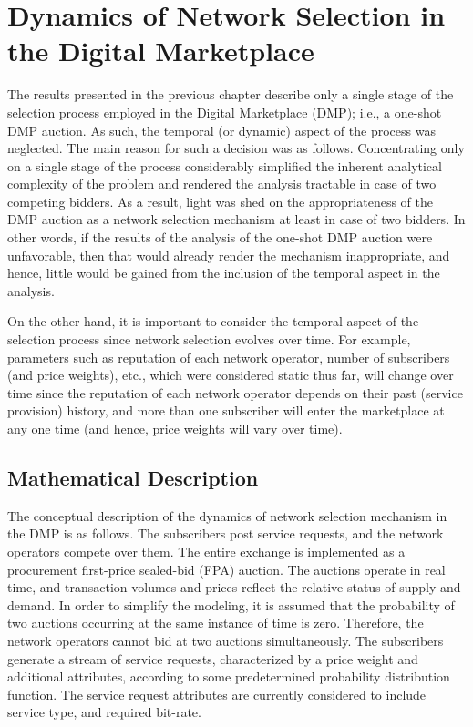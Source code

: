 \chapter{Dynamics of Network Selection in the Digital Marketplace} %
\label{cha:dynamics_of_network_selection_in_the_digital_marketplace}

\minitoc
\vspace{10mm}

The results presented in the previous chapter describe only a single stage of the selection process employed in the Digital Marketplace (DMP); i.e., a one-shot DMP auction. As such, the temporal (or dynamic) aspect of the process was neglected. The main reason for such a decision was as follows. Concentrating only on a single stage of the process considerably simplified the inherent analytical complexity of the problem and rendered the analysis tractable in case of two competing bidders. As a result, light was shed on the appropriateness of the DMP auction as a network selection mechanism at least in case of two bidders. In other words, if the results of the analysis of the one-shot DMP auction were unfavorable, then that would already render the mechanism inappropriate, and hence, little would be gained from the inclusion of the temporal aspect in the analysis.

On the other hand, it is important to consider the temporal aspect of the selection process since network selection evolves over time. For example, parameters such as reputation of each network operator, number of subscribers (and price weights), etc., which were considered static thus far, will change over time since the reputation of each network operator depends on their past (service provision) history, and more than one subscriber will enter the marketplace at any one time (and hence, price weights will vary over time).

\section{Mathematical Description} %
\label{sec:mathematical_description_dynamic}
The conceptual description of the dynamics of network selection mechanism in the DMP is as follows. The subscribers post service requests, and the network operators compete over them. The entire exchange is implemented as a procurement first-price sealed-bid (FPA) auction. The auctions operate in real time, and transaction volumes and prices reflect the relative status of supply and demand. In order to simplify the modeling, it is assumed that the probability of two auctions occurring at the same instance of time is zero. Therefore, the network operators cannot bid at two auctions simultaneously. The subscribers generate a stream of service requests, characterized by a price weight and additional attributes, according to some predetermined probability distribution function. The service request attributes are currently considered to include service type, and required bit-rate.

